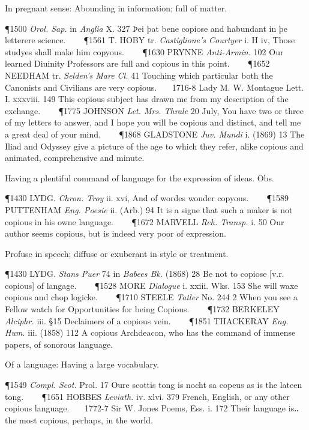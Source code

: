 \begin{description}[wide, labelwidth=!, labelindent=0pt]
\begin{myenumerate}
 In pregnant sense:  Abounding in information; full of matter.

\P 1500 \textit{Orol. Sap.} in  \textit{Anglia} X. 327 Þei þat bene copiose and habundant in þe letterere science.    
\P 1561 T. HOBY tr. \textit{Castiglione's Courtyer} i. H iv, Those studyes shall make him copyous.    
\P 1630 PRYNNE  \textit{Anti-Armin.} 102 Our learned Diuinity Professors are full and copious in this point.    
\P 1652 NEEDHAM tr.  \textit{Selden's Mare Cl.} 41 Touching which particular both the Canonists and Civilians are very copious.    1716-8 Lady M. W. Montague Lett. I. xxxviii. 149 This copious subject has drawn me from my description of the exchange.    
\P 1775 JOHNSON  \textit{Let. Mrs. Thrale} 20 July, You have two or three of my letters to answer, and I hope you will be copious and distinct, and tell me a great deal of your mind.    
\P 1868 GLADSTONE  \textit{Juv. Mundi} i. (1869) 13 The Iliad and Odyssey give a picture of the age to which they refer, alike copious and animated, comprehensive and minute.

 Having a plentiful command of language for the expression of ideas. Obs.

\P 1430 LYDG.  \textit{Chron. Troy} ii. xvi, And of wordes wonder copyous.    
\P 1589 PUTTENHAM  \textit{Eng. Poesie} ii. (Arb.) 94 It is a signe that such a maker is not copious in his owne language.    
\P 1672 MARVELL  \textit{Reh. Transp.} i. 50 Our author seems copious, but is indeed very poor of expression.

 Profuse in speech; diffuse or exuberant in style or treatment.

\P 1430 LYDG.  \textit{Stans Puer} 74 in \textit{Babees Bk.} (1868) 28 Be not to copiose [v.r. copious] of langage.    
\P 1528 MORE  \textit{Dialogue} i. xxiii. Wks. 153 She will waxe copious and chop logicke.    
\P 1710 STEELE  \textit{Tatler} No. 244 2 When you see a Fellow watch for Opportunities for being Copious.    
\P 1732 BERKELEY  \textit{Alciphr.} iii. §15 Declaimers of a copious vein.    
\P 1851 THACKERAY  \textit{Eng. Hum.} iii. (1858) 112 A copious Archdeacon, who has the command of immense papers, of sonorous language.

 Of a language: Having a large vocabulary.

\P 1549 \textit{Compl.  Scot.} Prol. 17 Oure scottis tong is nocht sa copeus as is the lateen tong.    
\P 1651 HOBBES  \textit{Leviath.} iv. xlvi. 379 French, English, or any other copious language.    1772-7 Sir W. Jones Poems, Ess. i. 172 Their language is‥the most copious, perhaps, in the world.


\end{myenumerate}
\end{description}

